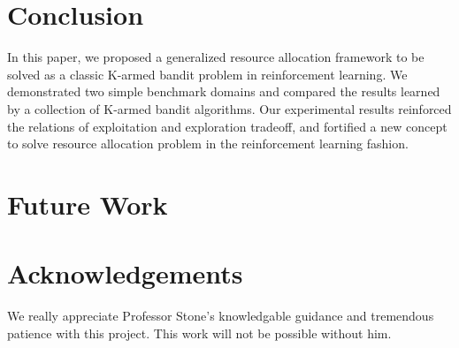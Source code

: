 \documentclass[conference]{IEEEtran}
\begin{document}
\newpage







\section{Conclusion}
In this paper, we proposed a generalized resource allocation framework to be solved as a classic K-armed bandit problem in reinforcement learning. We demonstrated two simple benchmark domains and compared the results learned by a collection of K-armed bandit algorithms. Our experimental results reinforced the relations of exploitation and exploration tradeoff, and fortified a new concept to solve resource allocation problem in the reinforcement learning fashion.

\section{Future Work}


\section{Acknowledgements}
We really appreciate Professor Stone's knowledgable guidance and tremendous patience with this project. This work will not be possible without him.
\end{document}
